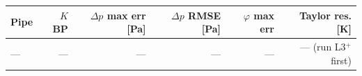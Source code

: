 \begin{tabular}{lrrrrr}
\toprule
Pipe & $K$ BP & $\Delta p$ max err [Pa] & $\Delta p$ RMSE [Pa] & $\varphi$ max err & Taylor res. [K] \\
\midrule
— & — & — & — & — & —  \quad (run L3$^+$ first) \\
\bottomrule
\end{tabular}
